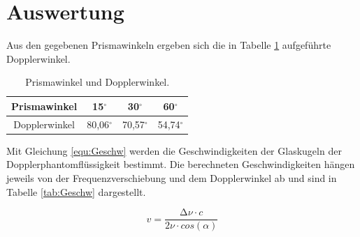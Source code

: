 \section{Auswertung}
\label{sec:Auswertung}

Aus den gegebenen Prismawinkeln ergeben sich die in Tabelle \ref{tab:1} aufgeführte Dopplerwinkel.

\begin{table}
    \centering
    \caption{Prismawinkel und Dopplerwinkel.}
    \label{tab:1}

    \begin{tabular}{c | c| c| c}
        \toprule
        Prismawinkel & 15$^{\circ}$    & 30$^{\circ}$    & 60$^{\circ}$   \\
        \midrule
        Dopplerwinkel& 80,06$^{\circ}$ & 70,57$^{\circ}$ & 54,74$^{\circ}$\\
        \bottomrule
    \end{tabular}

\end{table}

Mit Gleichung \eqref{equ:Geschw} werden die Geschwindigkeiten der Glaskugeln der Dopplerphantomflüssigkeit bestimmt.
Die berechneten Geschwindigkeiten hängen jeweils von der Frequenzverschiebung und dem Dopplerwinkel ab und 
sind in Tabelle \ref{tab:Geschw} dargestellt.

\begin{equation}
    \label{equ:Geschw}
    v = \frac{\increment \nu \cdot c}{2\nu \cdot cos(\alpha)}
\end{equation}

